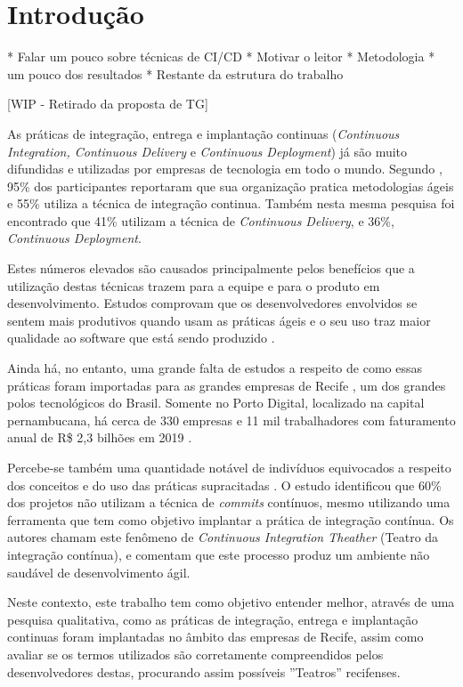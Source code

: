 
\chapter{Introdução}

* Falar um pouco sobre técnicas de CI/CD
* Motivar o leitor
* Metodologia
* um pouco dos resultados
* Restante da estrutura do trabalho

[WIP - Retirado da proposta de TG]

As práticas de integração, entrega e implantação continuas (\emph{Continuous Integration, Continuous Delivery} e \emph{Continuous Deployment}) já são muito difundidas e utilizadas por empresas de tecnologia em todo o mundo. Segundo \cite{stateAgileReport2020}, 95\% dos participantes reportaram que sua organização pratica metodologias ágeis e 55\% utiliza a técnica de integração continua. Também nesta mesma pesquisa foi encontrado que 41\% utilizam a técnica de \emph{Continuous Delivery}, e 36\%, \emph{Continuous Deployment}.

Estes números elevados são causados principalmente pelos benefícios que a utilização destas técnicas trazem para a equipe e para o produto em desenvolvimento. Estudos comprovam que os desenvolvedores envolvidos se sentem mais produtivos quando usam as práticas ágeis \cite{hilton2016} e o seu uso traz maior qualidade ao software que está sendo produzido \cite{savor2015}. 

Ainda há, no entanto, uma grande falta de estudos a respeito de como essas práticas foram importadas para as grandes empresas de Recife \cite{empiricalStudy2016}, um dos grandes polos tecnológicos do Brasil. Somente no Porto Digital, localizado na capital pernambucana, há cerca de 330 empresas e 11 mil trabalhadores com faturamento anual de R\$ 2,3 bilhões em 2019 \cite{portoDigital}.

Percebe-se também uma quantidade notável de indivíduos equivocados a respeito dos conceitos e do uso das práticas supracitadas \cite{debbiche2014challenges}. O estudo \cite{citheater2019} identificou que 60\% dos projetos não utilizam a técnica de \emph{commits} contínuos, mesmo utilizando uma ferramenta que tem como objetivo implantar a prática de integração contínua. Os autores chamam este fenômeno de \emph{Continuous Integration Theather} (Teatro da integração contínua), e comentam que este processo produz um ambiente não saudável de desenvolvimento ágil.

Neste contexto, este trabalho tem como objetivo entender melhor, através de uma pesquisa qualitativa, como as práticas de integração, entrega e implantação continuas foram implantadas no âmbito das empresas de Recife, assim como avaliar se os termos utilizados são corretamente compreendidos pelos desenvolvedores destas, procurando assim possíveis ''Teatros'' recifenses. 

